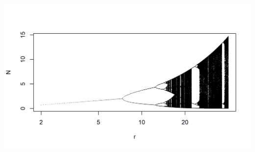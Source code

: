 \documentclass[]{article}
\begin{document}
\begin{center}\includegraphics{figure/intro-bifdiag-1} \end{center}
\end{document}

